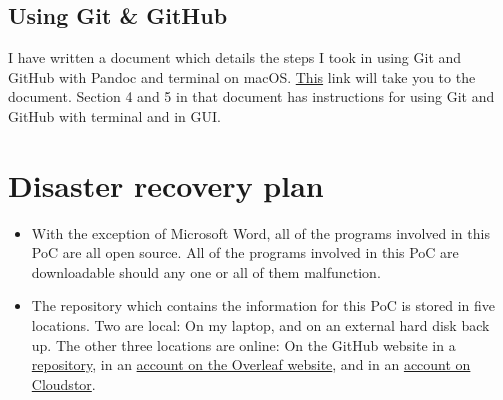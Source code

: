 \documentclass{article}
\begin{document}
\subsection{Using Git \& GitHub}

I have written a document which details the steps I took in using Git and GitHub with Pandoc and terminal on macOS. \href{https://github.com/MQ-FOAR705/Version-Control-Supervisor-Feedback-PoC/blob/master/Step-guide.md}{This} link will take you to the document. Section 4 and 5 in that document has instructions for using Git and GitHub with terminal and in GUI.

\section{Disaster recovery plan}

\begin{itemize}
    \item With the exception of Microsoft Word, all of the programs involved in this PoC are all open source. All of the programs involved in this PoC are downloadable should any one or all of them malfunction.
    \item The repository which contains the information for this PoC is stored in five locations. Two are local: On my laptop, and on an external hard disk back up. The other three locations are online: On the GitHub website in a \href{https://github.com/MQ-FOAR705/Version-Control-Supervisor-Feedback-PoC}{repository}, in an \href{https://www.overleaf.com/project/5dc25fe708305a00018fcaec}{account on the Overleaf website}, and in an \href{https://cloudstor.aarnet.edu.au/plus/apps/files/?dir=/PoC-2019/Version-Control-Supervisor-Feedback-PoC&fileid=3988737450}{account on Cloudstor}.
\end{itemize}
\end{document}
